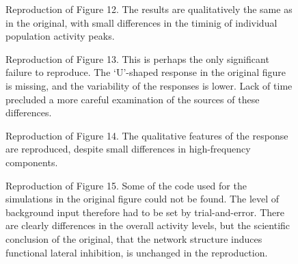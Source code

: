 \begin{figure}
    \begin{minipage}{0.48\textwidth}
        \caption{Reproduction of Figure 12. The results are qualitatively the same as in the original, with small differences
        in the timinig of individual population activity peaks.}
    \end{minipage}\hfill
    \begin{minipage}{0.48\textwidth}
        \caption{Reproduction of Figure 13. This is perhaps the only significant failure to reproduce. The `U'-shaped response
                 in the original figure is missing, and the variability of the responses is lower.
                 Lack of time precluded a more careful examination of the sources of these differences.}\label{fig:13}
    \end{minipage}
\end{figure}

\begin{figure}
    \begin{minipage}{0.48\textwidth}
        \caption{Reproduction of Figure 14. The qualitative features of the response are reproduced, despite small differences
        in high-frequency components.}
    \end{minipage}\hfill
    \begin{minipage}{0.48\textwidth}
        \caption{Reproduction of Figure 15. Some of the code used for the simulations in the original figure could not be found.
        The level of background input therefore had to be set by trial-and-error.
        There are clearly differences in the overall activity levels, but the scientific conclusion of the original,
        that the network structure induces functional lateral inhibition, is unchanged in the reproduction.}
    \end{minipage}
\end{figure}

